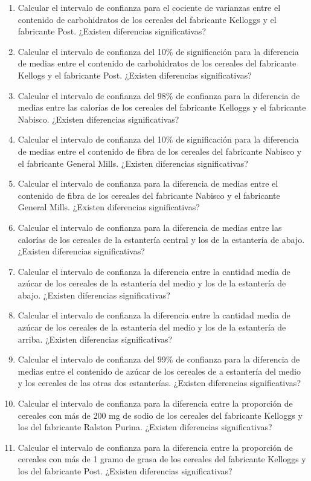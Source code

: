 \documentclass[a4paper,titlepage]{article}
\begin{document}
\begin{enumerate}[leftmargin=*]
\item Calcular el intervalo de confianza para el cociente de varianzas entre el contenido de carbohidratos de los cereales del fabricante Kelloggs y el fabricante Post. ¿Existen diferencias significativas?
\item Calcular el intervalo de confianza del 10\% de significación para la diferencia de medias entre el contenido de carbohidratos de los cereales del fabricante Kellogs y el fabricante Post. ¿Existen diferencias significativas?
\item Calcular el intervalo de confianza del 98\% de confianza para la diferencia de medias entre las calorías de los cereales del fabricante Kelloggs y el fabricante Nabisco. ¿Existen diferencias significativas?
\item Calcular el intervalo de confianza del 10\% de significación para la diferencia de medias entre el contenido de fibra de los cereales del fabricante Nabisco y el fabricante General Mills. ¿Existen diferencias significativas?
\item Calcular el intervalo de confianza para la diferencia de medias entre el contenido de fibra de los cereales del fabricante Nabisco y el fabricante General Mills. ¿Existen diferencias significativas?
\item Calcular el intervalo de confianza para la diferencia de medias entre las calorías de los cereales de la estantería central y los de la estantería de abajo. ¿Existen diferencias significativas?
\item Calcular el intervalo de confianza la diferencia entre la cantidad media de azúcar de los cereales de la estantería del medio y los de la estantería de abajo. ¿Existen diferencias significativas?
\item Calcular el intervalo de confianza la diferencia entre la cantidad media de azúcar de los cereales de la estantería del medio y los de la estantería de arriba. ¿Existen diferencias significativas?
\item Calcular el intervalo de confianza del 99\% de confianza para la diferencia de medias entre el contenido de azúcar de los cereales de a estantería del medio y los cereales de las otras dos estanterías. ¿Existen diferencias significativas?
\item Calcular el intervalo de confianza para la diferencia entre la proporción de cereales con más de 200 mg de sodio de los cereales del fabricante Kelloggs y los del fabricante Ralston Purina. ¿Existen diferencias significativas?
\item Calcular el intervalo de confianza para la diferencia entre la proporción de cereales con más de 1 gramo de grasa de los cereales del fabricante Kelloggs y los del fabricante Post. ¿Existen diferencias significativas?

\end{enumerate}
\end{document}
